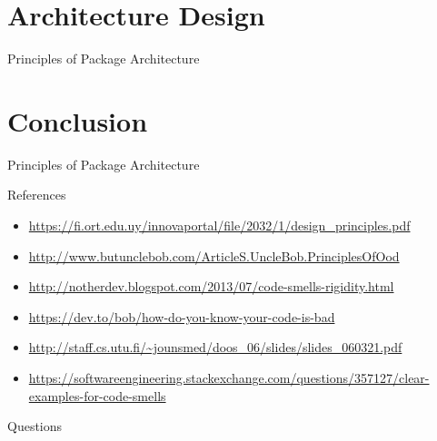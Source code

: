 \documentclass[xcolor=svgnames]{beamer}
\begin{document}

\begin{frame}{\subsecname}
\end{frame}


\section{Architecture Design}


\begin{frame}{Principles of Package Architecture}
\end{frame}


\section{Conclusion}


\begin{frame}{Principles of Package Architecture}
\end{frame}


\begin{frame}{References}
    \begin{itemize}
        \item \url{https://fi.ort.edu.uy/innovaportal/file/2032/1/design_principles.pdf}
        \item \url{http://www.butunclebob.com/ArticleS.UncleBob.PrinciplesOfOod}
        \item \url{http://notherdev.blogspot.com/2013/07/code-smells-rigidity.html}
        \item \url{https://dev.to/bob/how-do-you-know-your-code-is-bad}
        \item \url{http://staff.cs.utu.fi/~jounsmed/doos_06/slides/slides_060321.pdf}
        \item \url{https://softwareengineering.stackexchange.com/questions/357127/clear-examples-for-code-smells}
    \end{itemize}
\end{frame}


\begin{frame}{Questions}
\end{frame}

\fi
\end{document}

